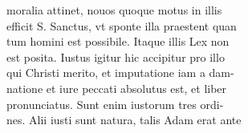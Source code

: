 \documentclass{article}
\begin{document}
\begin{pages}
                moralia attinet, nouos quoque motus in illis \\
                efficit S. Sanctus, vt sponte illa praestent quan \\
                tum homini est possibile. Itaque illis Lex non \\
                est posita. Iustus igitur hic accipitur pro illo \\
                qui Christi merito, et imputatione iam a dam- \\
                natione et iure peccati absolutus est, et liber \\
                pronunciatus. Sunt enim iustorum tres ordi- \\
                nes. Alii iusti sunt natura, talis Adam erat ante \\
                

\end{pages}
\end{document}
